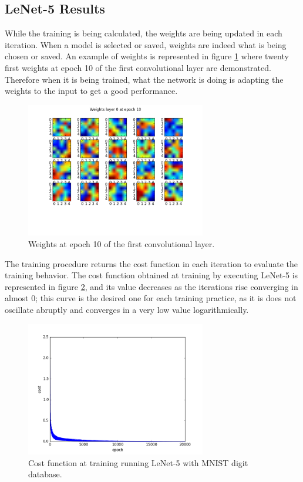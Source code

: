 \subsection{LeNet-5 Results} \label{sec:lenet_results}
While the training is being calculated, the weights are being updated in each iteration. When a  model is selected or saved, weights are indeed what is being chosen or saved. An example of weights is represented in figure \ref{fig:weights_lenet} where twenty first weights at epoch 10 of the first convolutional layer are demonstrated. Therefore when it is being trained, what the network is doing is adapting the weights to the input to get a good performance.\\

\begin{figure}[htb]
\centering
\includegraphics[width=0.7\textwidth]{images/images_lenet/w_layer0_epoch10.png}
\caption{Weights at epoch 10 of the first convolutional layer.} \label{fig:weights_lenet}
\end{figure}

The training procedure returns the cost function in each iteration to evaluate the training behavior. The cost function obtained at training by  executing LeNet-5 is represented in figure \ref{fig:Lenetcost}, and its value decreases as the iterations rise converging in almost 0; this curve is the desired one for each training practice, as it is does not oscillate abruptly and converges in a very low value logarithmically.\\

\begin{figure}[htb]
\centering
\includegraphics[width=0.7\textwidth]{images/images_lenet/cost_lenet.png}
\caption{Cost function at training running LeNet-5 with MNIST digit database.} \label{fig:Lenetcost}
\end{figure}

